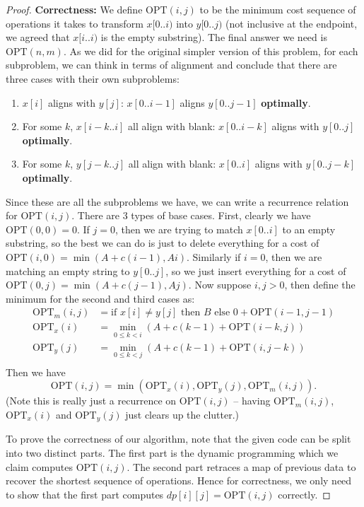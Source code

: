 \documentclass[10pt]{article}
\newcommand{\OPT}{\text{OPT}}
\begin{document}
\begin{proof}
  \textbf{Correctness:} We define \(\OPT(i, j)\) to be the minimum cost sequence of operations it takes to transform \(x[0..i)\) into \(y[0..j)\) (not inclusive at the endpoint, we agreed that \(x[i..i)\) is the empty substring). The final answer we need is \(\OPT(n, m)\). As we did for the original simpler version of this problem, for each subproblem, we can think in terms of alignment and conclude that there are three cases with their own subproblems: 
  \begin{enumerate}
    \item \(x[i]\) aligns with \(y[j]\): \(x[0..i-1]\) aligns \(y[0..j-1]\) \textbf{optimally}.
    \item For some \(k\), \(x[i-k..i]\) all align with blank:  \(x[0..i-k]\) aligns with \(y[0..j]\) \textbf{optimally}. 
    \item For some \(k\), \(y[j-k..j]\) all align with blank: \(x[0..i]\) aligns with \(y[0..j-k]\) \textbf{optimally}.
  \end{enumerate}
  Since these are all the subproblems we have, we can write a recurrence relation for \(\OPT(i, j)\). There are 3 types of base cases. First, clearly we have \(\OPT(0, 0) = 0\). If \(j = 0\), then we are trying to match \(x[0..i]\) to an empty substring, so the best we can do is just to delete everything for a cost of \(\OPT(i, 0) = \min(A + c(i - 1), Ai)\). Similarly if \(i = 0\), then we are matching an empty string to \(y[0..j]\), so we just insert everything for a cost of \(\OPT(0, j) = \min(A + c(j - 1), Aj)\). Now suppose \(i, j > 0\), then define the minimum for the second and third cases as:
  \begin{align*}
    \OPT_m(i, j) &= \text{if \(x[i] \neq y[j]\) then \(B\) else 0} + \OPT(i - 1, j - 1) \\
    \text{OPT}_x(i) &= \min_{0 \leq k < i}(A + c(k - 1) + \OPT(i - k, j)) \\
    \text{OPT}_y(j) &= \min_{0 \leq k < j}(A + c(k - 1) + \OPT(i, j - k)) \\
  \end{align*}
  Then we have 
  \[\OPT(i, j) = \min(\OPT_x(i), \OPT_y(j), \OPT_m(i, j)).\]
  (Note this is really just a recurrence on \(\OPT(i, j)\) -- having \(\OPT_m(i, j)\), \(\OPT_x(i)\) and \(\OPT_y(j)\) just clears up the clutter.)

  To prove the correctness of our algorithm, note that the given code can be split into two distinct parts. The first part is the dynamic programming which we claim computes \(\OPT(i, j)\). The second part retraces a map of previous data to recover the shortest sequence of operations. Hence for correctness, we only need to show that the first part computes \(dp[i][j] = \OPT(i, j)\) correctly. 


\end{proof}
\end{document}
